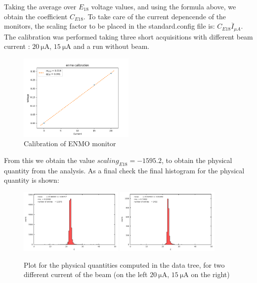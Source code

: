 Taking the average over $E_{18}$ voltage values, and using the formula above, we obtain the coefficient $C_{E18}$. To take care of the current depencende of the monitors, the scaling factor to be placed in the standard.config file is: $C_{E18} \overline{I}_{\mu A}$.
The calibration was performed taking three short acquisitions with different beam current : $\SI{20}{\micro \ampere}$, $\SI{15}{\micro \ampere}$ and a run without beam. 

\begin{figure}[hbtp]
\centering
\includegraphics[width = 0.5\textwidth]{Analysis/E18_Calibration.png}
\caption{Calibration of ENMO monitor}
\end{figure}

From this we obtain the value $scaling_{E18} = -1595.2$, to obtain the physical quantity from the analysis. As a final check the final histogram for the physical quantity is shown:

\begin{figure}[hbtp]
\centering
\includegraphics[width = 0.45\textwidth]{Analysis/ENMOCheck20.pdf}
\includegraphics[width = 0.45\textwidth]{Analysis/ENMOCheck15.pdf} 
\caption{Plot for the physical quantities computed in the data tree, for two different current of the beam (on the left $\SI{20}{\micro \ampere}$, $\SI{15}{\micro \ampere}$ on the right)}
\end{figure}



